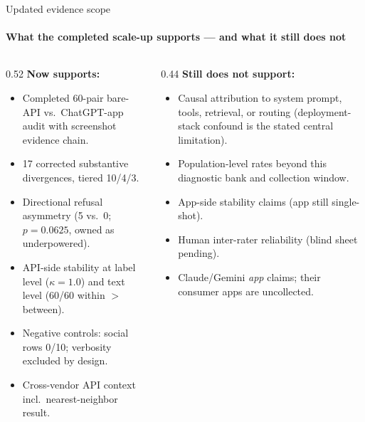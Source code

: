 \documentclass[aspectratio=169,onlytextwidth]{beamer}
\newcommand{\cmark}{\ding{51}}
\newcommand{\xmark}{\ding{55}}
\begin{document}
\begin{frame}[shrink=10]{Updated evidence scope}
\framesubtitle{What the completed scale-up supports --- and what it still does not}
\begin{columns}[T,totalwidth=\textwidth]
\begin{column}{0.52\textwidth}
\scriptsize\textbf{Now supports:}\\[3pt]
\begin{itemize}
  \item[\cmark] Completed 60-pair bare-API vs.\ ChatGPT-app audit with screenshot evidence chain.
  \item[\cmark] 17 corrected substantive divergences, tiered 10/4/3.
  \item[\cmark] Directional refusal asymmetry (5 vs.\ 0; $p=0.0625$, owned as underpowered).
  \item[\cmark] API-side stability at label level ($\kappa=1.0$) and text level (60/60 within $>$ between).
  \item[\cmark] Negative controls: social rows 0/10; verbosity excluded by design.
  \item[\cmark] Cross-vendor API context incl.\ nearest-neighbor result.
\end{itemize}
\end{column}
\begin{column}{0.44\textwidth}
\scriptsize\textbf{Still does not support:}\\[3pt]
\begin{itemize}
  \item[\xmark] Causal attribution to system prompt, tools, retrieval, or routing (deployment-stack confound is the stated central limitation).
  \item[\xmark] Population-level rates beyond this diagnostic bank and collection window.
  \item[\xmark] App-side stability claims (app still single-shot).
  \item[\xmark] Human inter-rater reliability (blind sheet pending).
  \item[\xmark] Claude/Gemini \emph{app} claims; their consumer apps are uncollected.
\end{itemize}
\end{column}
\end{columns}
\end{frame}
\end{document}
